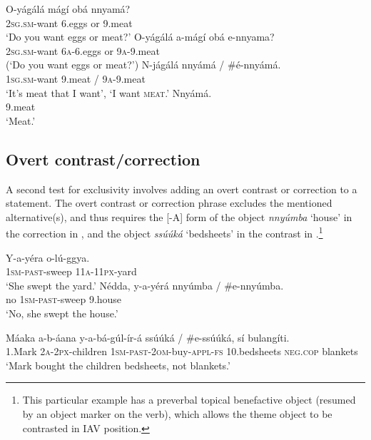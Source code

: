 \documentclass[output=paper]{langsci/langscibook}
\begin{document}
\ea\label{ex:vanderwal:26}
\ea\label{ex:vanderwal:26a}
\gll    O-yágálá    mágí    obá  nnyamá?\\
         \textsc{2sg}.\textsc{sm}-want    6.eggs    or  9.meat \\
\glt     ‘Do you want eggs or meat?’
\ex\label{ex:vanderwal:26b}
\gll    *O-yágálá    a-mágí  obá  e-nnyama?\\
         \textsc{2sg}.\textsc{sm}-want    \textsc{6a}-6.eggs  or  \textsc{9a}-9.meat\\
\glt     (‘Do you want eggs or meat?’)
\ex\label{ex:vanderwal:26c}
\gll      N-jágálá    nnyámá / \#é-nnyámá.\\
         \textsc{1sg}.\textsc{sm}-want    9.meat / \textsc{9a}-9.meat\\
\glt     ‘It’s meat that I want’, ‘I want \textsc{meat}.’
\ex\label{ex:vanderwal:26d}
\gll     Nnyámá.\\
         9.meat\\
\glt     ‘Meat.’
\z
\z

\subsection{Overt contrast/correction}\label{sec:vanderwal:4.2} %

A second test for exclusivity involves adding an overt contrast or correction to a statement. The overt contrast or correction phrase excludes the mentioned alternative(s), and thus requires the [-A] form of the object \textit{nnyúmba} ‘house’ in the correction in , and the object \textit{ssúúká} ‘bedsheets’ in the contrast in .\footnote{This particular example has a preverbal topical benefactive object (resumed by an object marker on the verb), which allows the theme object to be contrasted in IAV position.}

\ea\label{ex:vanderwal:27}
\ea\label{ex:vanderwal:27a}
\gll      Y-a-yéra    o-lú-ggya.\\
         \textsc{1sm}-\textsc{past}-sweep  \textsc{11a}-\textsc{11px}-yard\\
\glt     ‘She swept the yard.’
\ex\label{ex:vanderwal:27b}
\gll     Nédda,  y-a-yérá    nnyúmba / \#e-nnyúmba.\\
         no    \textsc{1sm}-\textsc{past}-sweep 9.house\\
\glt     ‘No, she swept the house.’
\z
\z

\ea\label{ex:vanderwal:28}
\gll   Máaka  a-b-áana    y-a-bá-gúl-ír-á        {ssúúká / \#e-ssúúká},  sí    bulangíti. \\
       1.Mark  \textsc{2a}-\textsc{2px}-children  \textsc{1sm}-\textsc{past}-\textsc{2om}-buy-\textsc{appl}-\textsc{fs}  10.bedsheets     \textsc{neg}.\textsc{cop}  blankets\\
    ‘Mark bought the children bedsheets, not blankets.’
\z
\end{document}
